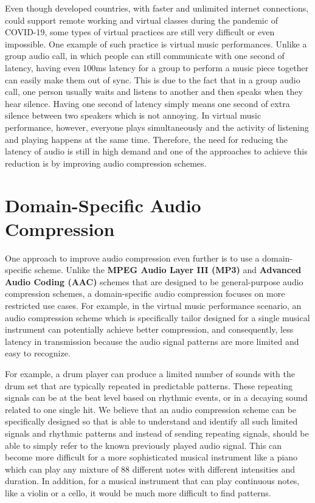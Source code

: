 Even though developed countries, with faster and unlimited internet connections, could support remote working and virtual classes during the pandemic of COVID-19, some types of virtual practices are still very difficult or even impossible\cite{bartlette2006effect,chafe2010effect}. One example of such practice is virtual music performances. Unlike a group audio call, in which people can still communicate with one second of latency, having even 100ms latency for a group to perform a music piece together can easily make them out of sync\cite{chafe2004effect,bartlette2006effect}. This is due to the fact that in a group audio call, one person usually waits and listens to another and then speaks when they hear silence. Having one second of latency simply means one second of extra silence between two speakers which is not annoying. In virtual music performance, however, everyone plays simultaneously and the activity of listening and playing happens at the same time. Therefore, the need for reducing the latency of audio is still in high demand and one of the approaches to achieve this reduction is by improving audio compression schemes.



\section{Domain-Specific Audio Compression} 

One approach to improve audio compression even further is to use a domain-specific scheme. Unlike the \textbf{MPEG Audio Layer III (MP3)} and \textbf{Advanced Audio Coding (AAC)} schemes that are designed to be general-purpose audio compression schemes, a domain-specific audio compression focuses on more restricted use cases. For example, in the virtual music performance scenario, an audio compression scheme which is specifically tailor designed for a single musical instrument can potentially achieve better compression, and consequently, less latency in transmission because the audio signal patterns are more limited and easy to recognize. 

For example, a drum player can produce a limited number of sounds with the drum set that are typically repeated in  predictable patterns. These repeating signals can be at the beat level based on rhythmic events, or in a decaying sound related to one single hit. We believe that an audio compression scheme can be specifically designed so that is able to understand and identify all such limited signals and rhythmic patterns and instead of sending repeating signals, should be able to simply refer to the known previously played audio signal. This can become more difficult for a more sophisticated musical instrument like a piano which can play any mixture of 88 different notes with different intensities and duration. In addition, for a musical instrument that can play continuous notes, like a violin or a cello, it would be much more difficult to find patterns.

